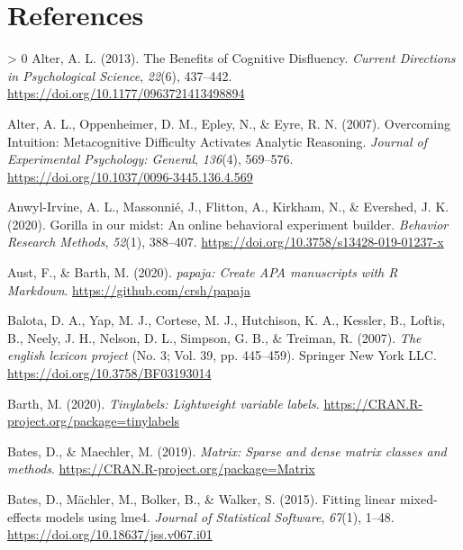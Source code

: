 \documentclass[
  english,
  jou]{apa7}
\newlength{\cslhangindent}
\newenvironment{CSLReferences}[3] %
 {%
  \setlength{\parindent}{0pt}
  \ifodd #1 \everypar{\setlength{\hangindent}{\cslhangindent}}\ignorespaces\fi
  \ifnum #2 > 0
  \setlength{\parskip}{#2\baselineskip}
  \fi
 }%
 {}
\begin{document}
\newpage

\hypertarget{references}{%
\section{References}\label{references}}

\begingroup
\setlength{\parindent}{-0.5in}
\setlength{\leftskip}{0.5in}

\hypertarget{refs}{}
\begin{CSLReferences}{1}{0}
\leavevmode\hypertarget{ref-Alter2013}{}%
Alter, A. L. (2013). {The Benefits of Cognitive Disfluency}. \emph{Current Directions in Psychological Science}, \emph{22}(6), 437--442. \url{https://doi.org/10.1177/0963721413498894}

\leavevmode\hypertarget{ref-Alter2007}{}%
Alter, A. L., Oppenheimer, D. M., Epley, N., \& Eyre, R. N. (2007). {Overcoming Intuition: Metacognitive Difficulty Activates Analytic Reasoning}. \emph{Journal of Experimental Psychology: General}, \emph{136}(4), 569--576. \url{https://doi.org/10.1037/0096-3445.136.4.569}

\leavevmode\hypertarget{ref-Anwyl-Irvine2020}{}%
Anwyl-Irvine, A. L., Massonnié, J., Flitton, A., Kirkham, N., \& Evershed, J. K. (2020). {Gorilla in our midst: An online behavioral experiment builder}. \emph{Behavior Research Methods}, \emph{52}(1), 388--407. \url{https://doi.org/10.3758/s13428-019-01237-x}

\leavevmode\hypertarget{ref-R-papaja}{}%
Aust, F., \& Barth, M. (2020). \emph{{papaja}: {Create} {APA} manuscripts with {R Markdown}}. \url{https://github.com/crsh/papaja}

\leavevmode\hypertarget{ref-Balota2007}{}%
Balota, D. A., Yap, M. J., Cortese, M. J., Hutchison, K. A., Kessler, B., Loftis, B., Neely, J. H., Nelson, D. L., Simpson, G. B., \& Treiman, R. (2007). \emph{{The english lexicon project}} (No. 3; Vol. 39, pp. 445--459). Springer New York LLC. \url{https://doi.org/10.3758/BF03193014}

\leavevmode\hypertarget{ref-R-tinylabels}{}%
Barth, M. (2020). \emph{Tinylabels: Lightweight variable labels}. \url{https://CRAN.R-project.org/package=tinylabels}

\leavevmode\hypertarget{ref-R-Matrix}{}%
Bates, D., \& Maechler, M. (2019). \emph{Matrix: Sparse and dense matrix classes and methods}. \url{https://CRAN.R-project.org/package=Matrix}

\leavevmode\hypertarget{ref-R-lme4}{}%
Bates, D., Mächler, M., Bolker, B., \& Walker, S. (2015). Fitting linear mixed-effects models using {lme4}. \emph{Journal of Statistical Software}, \emph{67}(1), 1--48. \url{https://doi.org/10.18637/jss.v067.i01}


\end{CSLReferences}
\end{document}
